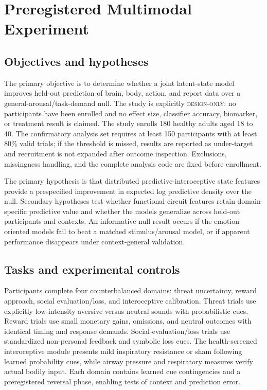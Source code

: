 \documentclass[conference]{IEEEtran}
\newcommand{\designonly}{\textsc{design-only}}
\begin{document}
\section{Preregistered Multimodal Experiment}\label{sec:design}

\subsection{Objectives and hypotheses}

The primary objective is to determine whether a joint latent-state model improves held-out prediction of brain, body, action, and report data over a general-arousal/task-demand null. The study is explicitly \designonly{}: no participants have been enrolled and no effect size, classifier accuracy, biomarker, or treatment result is claimed. The study enrolls 180 healthy adults aged 18 to 40. The confirmatory analysis set requires at least 150 participants with at least 80\% valid trials; if the threshold is missed, results are reported as under-target and recruitment is not expanded after outcome inspection. Exclusions, missingness handling, and the complete analysis code are fixed before enrollment.

The primary hypothesis is that distributed predictive-interoceptive state features provide a prespecified improvement in expected log predictive density over the null. Secondary hypotheses test whether functional-circuit features retain domain-specific predictive value and whether the models generalize across held-out participants and contexts. An informative null result occurs if the emotion-oriented models fail to beat a matched stimulus/arousal model, or if apparent performance disappears under context-general validation.

\subsection{Tasks and experimental controls}

Participants complete four counterbalanced domains: threat uncertainty, reward approach, social evaluation/loss, and interoceptive calibration. Threat trials use explicitly low-intensity aversive versus neutral sounds with probabilistic cues. Reward trials use small monetary gains, omissions, and neutral outcomes with identical timing and response demands. Social-evaluation/loss trials use standardized non-personal feedback and symbolic loss cues. The health-screened interoceptive module presents mild inspiratory resistance or sham following learned probability cues, while airway pressure and respiratory measures verify actual bodily input. Each domain contains learned cue contingencies and a preregistered reversal phase, enabling tests of context and prediction error.
\end{document}
